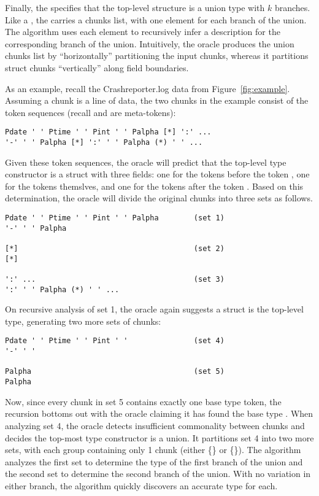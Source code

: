 Finally, the  specifies that the top-level structure
is a union type with $k$ branches.  Like a , the
 carries a chunks list, with one element for each
branch of the union.  The algorithm uses each element to recursively
infer a description for the corresponding branch of the union. 
Intuitively, the oracle produces the union chunks list by ``horizontally''
partitioning the input chunks, whereas it partitions struct chunks
``vertically'' along field boundaries. 

As an example, recall the Crashreporter.log data from
Figure~\ref{fig:example}.  Assuming a chunk is a line of data, the two
chunks in the example consist of the token sequences
(recall \cd{[*]} and \cd{(*)} are meta-tokens):

{\small
\begin{verbatim}
Pdate ' ' Ptime ' ' Pint ' ' Palpha [*] ':' ...
'-' ' ' Palpha [*] ':' ' ' Palpha (*) ' ' ...
\end{verbatim}
}%
\noindent
Given these token sequences, 
the oracle will predict that the top-level type constructor is a struct 
with three fields: one for the tokens before the token \cd{[*]}, one
for the \cd{[*]} tokens themslves, and one for the tokens after the token
\cd{[*]}. Based on this determination, the oracle will divide the
original chunks into three sets as follows.

{\small
\begin{verbatim}
Pdate ' ' Ptime ' ' Pint ' ' Palpha        (set 1)       
'-' ' ' Palpha 

[*]                                        (set 2)       
[*]

':' ...                                    (set 3)       
':' ' ' Palpha (*) ' ' ...
\end{verbatim}
}%

\noindent
On recursive analysis of set 1, the oracle again suggests a struct is the top-level type,
generating two more sets of chunks: 

{\small
\begin{verbatim}
Pdate ' ' Ptime ' ' Pint ' '               (set 4)       
'-' ' '

Palpha                                     (set 5)       
Palpha 
\end{verbatim}
}%

\noindent
Now, since every chunk in set 5 contains exactly one base type
token, the recursion bottoms out with the oracle claiming it has
found the base type .  When analyzing set 4, 
the oracle detects insufficient commonality between chunks and decides
the top-most type constructor is a union. It partitions set 4 into
two more sets, with each group containing only 1 chunk (either
\{\} or \{\}).  The algorithm analyzes
the first set to determine the type of the first branch of the union
and the second set to determine the second branch of the union.
With no variation in either branch, the algorithm quickly discovers an
accurate type for each. 

